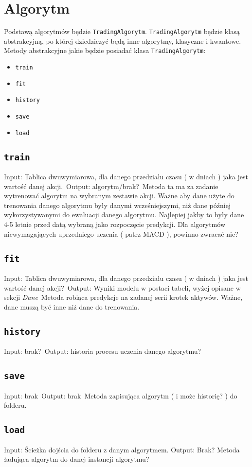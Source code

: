 \documentclass[polish,envcountsect,10pt]{article}
\begin{document}
\section{Algorytm}

Podstawą algorytmów będzie \texttt{TradingAlgorytm}. \texttt{TradingAlgorytm}  będzie klasą abstrakcyjną, po której dziedziczyć będą inne algorytmy, klasyczne i kwantowe.
Metody abstrakcyjne jakie będzie posiadać klasa \texttt{TradingAlgorytm}:
\begin{itemize}
    \item \texttt{train}
    \item\texttt{fit}
    \item \texttt{history}
    \item \texttt{save}
    \item \texttt{load}
\end{itemize}


\subsection{\texttt{train}}
Input: Tablica dwuwymiarowa, dla danego przedziału czasu ( w dniach ) jaka jest wartość danej akcji.\
Output: algorytm/brak?\
Metoda ta ma za zadanie wytrenować algorytm na wybranym zestawie akcji. 
Ważne aby dane użyte do trenowania danego algorytmu były danymi wcześniejszymi, niż dane później wykorzystywanymi do ewaluacji danego algorytmu.
Najlepiej jakby to były dane 4-5 letnie przed datą wybraną jako rozpoczęcie predykcji.
Dla algorytmów niewymagających uprzedniego uczenia ( patrz MACD ), powinno zwracać nic?
\subsection{\texttt{fit}}
Input: Tablica dwuwymiarowa, dla danego przedziału czasu ( w dniach ) jaka jest wartość danej akcji?\
Output: Wyniki modelu w postaci tabeli, wyżej opisane w sekcji \emph{Dane}\
Metoda robiąca predykcje na zadanej serii krotek aktywów.
Ważne, dane muszą być inne niż dane do trenowania.
\subsection{\texttt{history}}
Input: brak?\
Output: historia procesu uczenia danego algorytmu?
\subsection{\texttt{save}}
Input: brak\
Output: brak\
Metoda zapisująca algorytm ( i może historię? ) do folderu. 
\subsection{\texttt{load}}
Input: Ścieżka dojścia do folderu z danym algorytmem.
Output: Brak?
Metoda ładująca algorytm do danej instancji algorytmu?
\end{document}
